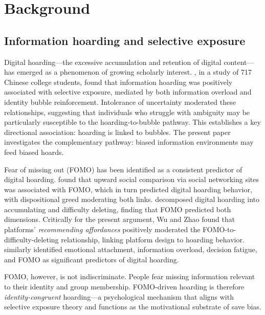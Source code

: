 \documentclass[12pt,a4paper]{article}
\begin{document}
\section{Background}

\subsection{Information hoarding and selective exposure}

Digital hoarding---the excessive accumulation and retention of digital content---has emerged as a phenomenon of growing scholarly interest.
\citet{Bai2025}, in a study of 717 Chinese college students, found that information hoarding was positively associated with selective exposure, mediated by both information overload and identity bubble reinforcement.
Intolerance of uncertainty moderated these relationships, suggesting that individuals who struggle with ambiguity may be particularly susceptible to the hoarding-to-bubble pathway.
This establishes a key directional association: hoarding is linked to bubbles.
The present paper investigates the complementary pathway: biased information environments may feed biased hoards.

Fear of missing out (FOMO) has been identified as a consistent predictor of digital hoarding.
\citet{Wang2023} found that upward social comparison via social networking sites was associated with FOMO, which in turn predicted digital hoarding behavior, with dispositional greed moderating both links.
\citet{Wu2023} decomposed digital hoarding into accumulating and difficulty deleting, finding that FOMO predicted both dimensions.
Critically for the present argument, Wu and Zhao found that platforms' \emph{recommending affordances} positively moderated the FOMO-to-difficulty-deleting relationship, linking platform design to hoarding behavior.
\citet{Zaremohzzabieh2024} similarly identified emotional attachment, information overload, decision fatigue, and FOMO as significant predictors of digital hoarding.

FOMO, however, is not indiscriminate.
People fear missing information relevant to their identity and group membership.
FOMO-driven hoarding is therefore \emph{identity-congruent} hoarding---a psychological mechanism that aligns with selective exposure theory and functions as the motivational substrate of save bias.
\end{document}
